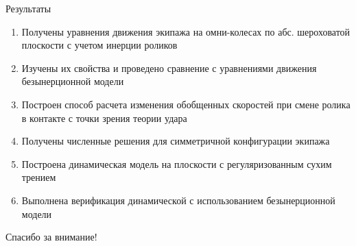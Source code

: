 \documentclass{beamer}
\begin{document}
\begin{frame}{Результаты}
    \begin{enumerate}
        \item Получены уравнения движения экипажа на омни-колесах по абс. шероховатой плоскости с учетом инерции роликов
        \item Изучены их свойства и проведено сравнение с уравнениями движения безынерционной модели
        \item Построен способ расчета изменения обобщенных скоростей при смене ролика в контакте с точки зрения теории удара
        \item Получены численные решения для симметричной конфигурации экипажа
        \item Построена динамическая модель на плоскости с регуляризованным сухим трением
        \item Выполнена верификация динамической с использованием безынерционной модели
    \end{enumerate}
    \vspace{-10pt}
    \centering
    \textcolor{Periwinkle}{Спасибо за внимание!}
\end{frame}

\end{document}

